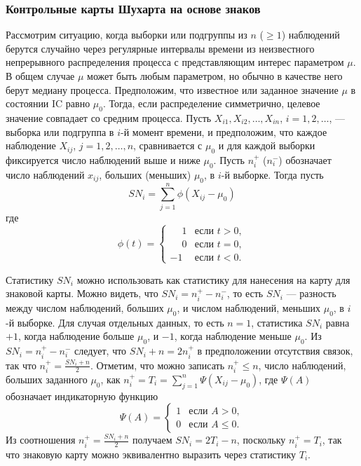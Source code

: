 \subsubsection{Контрольные карты Шухарта на основе знаков}
Рассмотрим ситуацию, когда выборки или подгруппы из \(n\) (\(\ge 1\)) наблюдений берутся случайно через регулярные интервалы времени из неизвестного непрерывного распределения процесса с представляющим интерес параметром \(\mu\). В общем случае \(\mu\) может быть любым параметром, но обычно в качестве него берут медиану процесса. Предположим, что известное или заданное значение \(\mu\) в состоянии IC равно \(\mu_0\). Тогда, если распределение симметрично, целевое значение совпадает со средним процесса. Пусть \(X_{i1}, X_{i2}, \ldots, X_{in}\), \(i = 1, 2, \ldots\), --- выборка или подгруппа в \(i\)-й момент времени, и предположим, что каждое наблюдение \(X_{ij}\), \(j = 1, 2, \ldots, n\), сравнивается с \(\mu_0\) и для каждой выборки фиксируется число наблюдений выше и ниже \(\mu_0\). Пусть \(n_i^+\) (\(n_i^-\)) обозначает число наблюдений \(x_{ij}\), больших (меньших) \(\mu_0\), в \(i\)-й выборке. Тогда пусть
\begin{equation}
	SN_i = \sum_{j=1}^{n} \phi(X_{ij} - \mu_0)
	\label{eq:4.1}
\end{equation}
где
\begin{equation}
	\phi(t) =
	\begin{cases}
		\phantom{-}1 & \text{если } t > 0, \\
		\phantom{-}0 & \text{если } t = 0, \\
		-1 & \text{если } t < 0.
	\end{cases}
	\label{eq:4.2}
\end{equation}

Статистику \(SN_i\) можно использовать как статистику для нанесения на карту для знаковой карты. Можно видеть, что \(SN_i = n_i^+ - n_i^-\), то есть \(SN_i\) --- разность между числом наблюдений, больших \(\mu_0\), и числом наблюдений, меньших \(\mu_0\), в \(i\)-й выборке. Для случая отдельных данных, то есть \(n = 1\), статистика \(SN_i\) равна \(+1\), когда наблюдение больше \(\mu_0\), и \(-1\), когда наблюдение меньше \(\mu_0\). Из \(SN_i = n_i^+ - n_i^-\) следует, что \(SN_i + n = 2n_i^+\) в предположении отсутствия связок, так что \(n_i^+ = \frac{SN_i + n}{2}\). Отметим, что можно записать \(n_i^+ \le n\), число наблюдений, больших заданного \(\mu_0\), как \(n_i^+ = T_i = \sum_{j=1}^{n} \Psi(X_{ij} - \mu_0)\), где \(\Psi(A)\) обозначает индикаторную функцию
\[
\Psi(A) =
\begin{cases}
	1 & \text{если } A > 0, \\
	0 & \text{если } A \le 0.
\end{cases}
\]
Из соотношения \(n_i^+ = \frac{SN_i + n}{2}\) получаем \(SN_i = 2T_i - n\), поскольку \(n_i^+ = T_i\), так что знаковую карту можно эквивалентно выразить через статистику \(T_i\).

